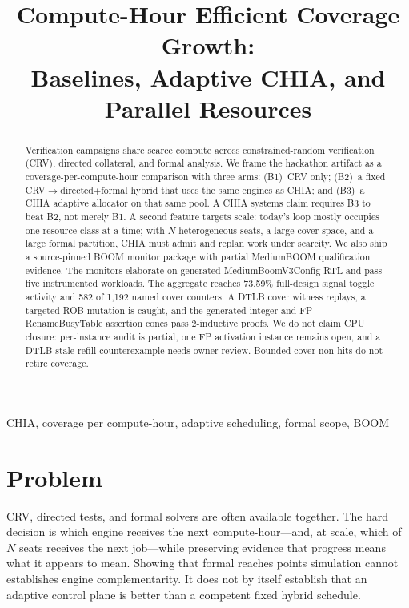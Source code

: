 \documentclass[conference,letterpaper]{IEEEtran}
\begin{document}
\title{Compute-Hour Efficient Coverage Growth:\\
Baselines, Adaptive CHIA, and Parallel Resources}

\author{
}

\maketitle

\begin{abstract}
Verification campaigns share scarce compute across constrained-random
verification (CRV), directed collateral, and formal analysis. We frame the
hackathon artifact as a coverage-per-compute-hour comparison with three arms:
(B1)~CRV only; (B2)~a fixed CRV$\rightarrow$directed$+$formal hybrid that uses
the same engines as CHIA; and (B3)~a CHIA adaptive allocator on that same pool.
A CHIA systems claim requires B3 to beat B2, not merely B1. A second feature
targets scale: today's loop mostly occupies one resource class at a time;
with $N$ heterogeneous seats, a large cover space, and a large formal
partition, CHIA must admit and replan work under scarcity. We also ship a
source-pinned BOOM monitor package with partial MediumBOOM qualification
evidence. The monitors elaborate on generated MediumBoomV3Config RTL and pass
five instrumented workloads. The aggregate reaches 73.59\% full-design signal
toggle activity and 582 of 1,192 named cover counters. A DTLB cover witness
replays, a targeted ROB mutation is caught, and the generated integer and FP
RenameBusyTable assertion cones pass 2-inductive proofs. We do not claim CPU
closure: per-instance audit is partial, one FP activation instance remains
open, and a DTLB stale-refill counterexample needs owner review. Bounded cover
non-hits do not retire coverage.
\end{abstract}

\begin{IEEEkeywords}
CHIA, coverage per compute-hour, adaptive scheduling, formal scope, BOOM
\end{IEEEkeywords}

\section{Problem}

CRV, directed tests, and formal solvers are often available together. The hard
decision is which engine receives the next compute-hour---and, at scale, which
of $N$ seats receives the next job---while preserving evidence that progress
means what it appears to mean. Showing that formal reaches points simulation
cannot establishes engine complementarity. It does not by itself establish that
an adaptive control plane is better than a competent fixed hybrid schedule.
\end{document}
